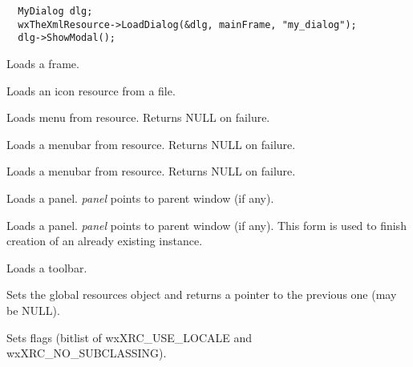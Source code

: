 \begin{verbatim}
  MyDialog dlg;
  wxTheXmlResource->LoadDialog(&dlg, mainFrame, "my_dialog");
  dlg->ShowModal();
\end{verbatim}

\label{wxxmlresourceloadframe}


Loads a frame.

\label{wxxmlresourceloadicon}


Loads an icon resource from a file.

\label{wxxmlresourceloadmenu}


Loads menu from resource. Returns NULL on failure.

\label{wxxmlresourceloadmenubar}


Loads a menubar from resource. Returns NULL on failure.


Loads a menubar from resource. Returns NULL on failure.

\label{wxxmlresourceloadpanel}


Loads a panel. {\it panel} points to parent window (if any).


Loads a panel. {\it panel} points to parent window (if any). This form
is used to finish creation of an already existing instance.

\label{wxxmlresourceloadtoolbar}


Loads a toolbar.

\label{wxxmlresourceset}


Sets the global resources object and returns a pointer to the previous one (may be NULL).

\label{wxxmlresourcesetflags}


Sets flags (bitlist of wxXRC\_USE\_LOCALE and wxXRC\_NO\_SUBCLASSING).

